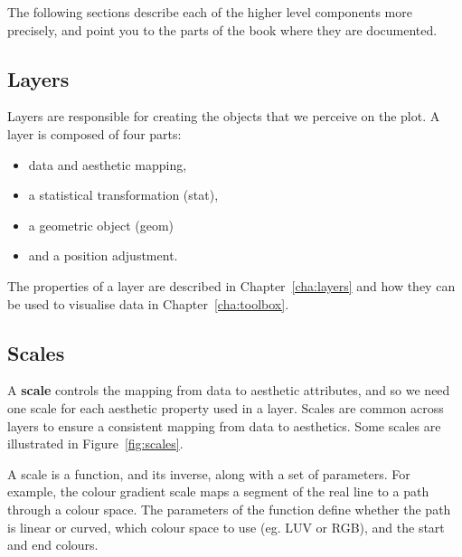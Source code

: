 The following sections describe each of the higher level components more precisely, and point you to the parts of the book where they are documented.

\subsection{Layers}

Layers are responsible for creating the objects that we perceive on the plot.  A layer is composed of four parts:  

\begin{itemize}
  \item data and aesthetic mapping,
  \item a statistical transformation (stat), 
  \item a geometric object (geom)
  \item and a position adjustment.
\end{itemize}

\noindent The properties of a layer are described in Chapter~\ref{cha:layers} and how they can be used to visualise data in Chapter~\ref{cha:toolbox}.

\subsection{Scales}\label{sec:scales}

A {\bf scale} controls the mapping from data to aesthetic attributes, and so we need one scale for each aesthetic property used in a layer.  Scales are common across layers to ensure a consistent mapping from data to aesthetics.  Some scales are illustrated in Figure~\ref{fig:scales}.

% 


A scale is a function, and its inverse, along with a set of parameters.  For example, the colour gradient scale maps a segment of the real line to a path through a colour space.  The parameters of the function define whether the path is linear or curved, which colour space to use (eg. LUV or RGB), and the start and end colours.  

